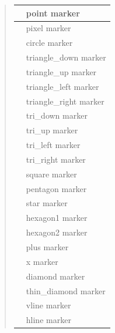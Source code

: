\documentclass[letterpaper,10pt,english]{sphinxmanual}
\begin{document}
\begin{fulllineitems}
\begin{fulllineitems}
\begin{quote}
\begin{description}
\begin{tabulary}{\linewidth}{|L|L|}
 & 
point marker
\\\hline

 & 
pixel marker
\\\hline

 & 
circle marker
\\\hline

 & 
triangle\_down marker
\\\hline

 & 
triangle\_up marker
\\\hline

 & 
triangle\_left marker
\\\hline

 & 
triangle\_right marker
\\\hline

 & 
tri\_down marker
\\\hline

 & 
tri\_up marker
\\\hline

 & 
tri\_left marker
\\\hline

 & 
tri\_right marker
\\\hline

 & 
square marker
\\\hline

 & 
pentagon marker
\\\hline

 & 
star marker
\\\hline

 & 
hexagon1 marker
\\\hline

 & 
hexagon2 marker
\\\hline

 & 
plus marker
\\\hline

 & 
x marker
\\\hline

 & 
diamond marker
\\\hline

 & 
thin\_diamond marker
\\\hline

 & 
vline marker
\\\hline

 & 
hline marker
\\\hline


\end{tabulary}
\end{description}
\end{quote}
\end{fulllineitems}
\end{fulllineitems}
\end{document}

